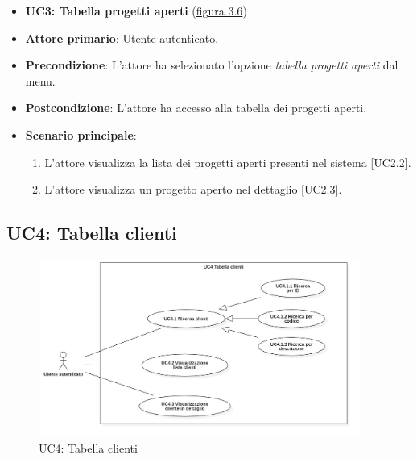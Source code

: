 \begin{itemize}
\item \textbf{UC3: Tabella progetti aperti} ({\hyperref[fig:UC3]{figura 3.6}})
\item \textbf{Attore primario}: Utente autenticato.
\item \textbf{Precondizione}: L'attore ha selezionato l'opzione \textit{tabella progetti aperti} dal menu.
\item \textbf{Postcondizione}: L'attore ha accesso alla tabella dei progetti aperti.
\item \textbf{Scenario principale}: 
\begin{enumerate}
\item L'attore visualizza la lista dei progetti aperti presenti nel sistema [UC2.2].
\item L'attore visualizza un progetto aperto nel dettaglio [UC2.3].
\end{enumerate}
\end{itemize}

\pagebreak

\subsection{UC4: Tabella clienti}
\begin{figure}[!h]
\centering
\includegraphics[width=400px]{../images/UC/.jpeg/UC4.0-tabellaClienti.jpg}
\caption{UC4: Tabella clienti}
\label{fig:UC4}
\end{figure}

